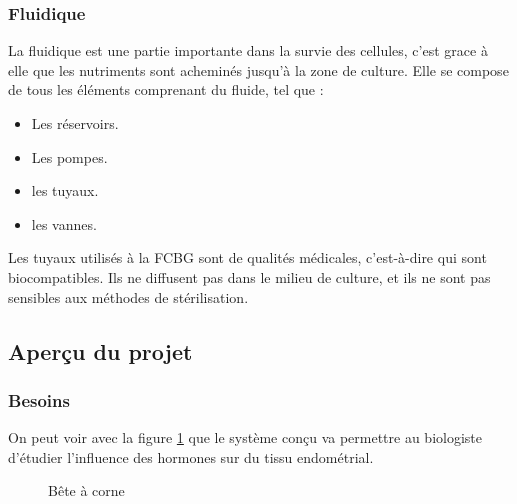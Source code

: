\documentclass[a4paper, 11pt]{article}
\begin{document}
\subsubsection{Fluidique}
La fluidique est une partie importante dans la survie des cellules, c'est grace à elle que les
nutriments sont acheminés jusqu'à la zone de culture.
Elle se compose de tous les éléments comprenant du fluide, tel que :
\begin{itemize}
    \item Les réservoirs.
    \item Les pompes.
    \item les tuyaux.
    \item les vannes.
\end{itemize}
Les tuyaux utilisés à la FCBG sont de qualités médicales, c'est-à-dire qui sont biocompatibles. Ils ne diffusent pas
dans le milieu de culture, et ils ne sont pas sensibles aux méthodes de stérilisation.
\newpage
\subsection{Aperçu du projet}
\subsubsection{Besoins}
On peut voir avec la figure \ref{fig:bete_corne} que le système conçu va permettre au biologiste d'étudier l'influence des hormones sur du tissu endométrial.
\begin{figure}[H]
    \centering
    \caption{Bête à corne}
    \label{fig:bete_corne}
\end{figure}
\end{document}

